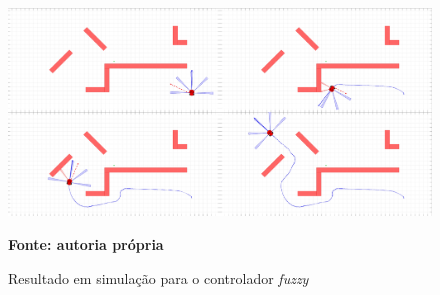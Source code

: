 \begin{figure}[ht]
\centering
\caption{Resultado em simulação para o controlador \textit{fuzzy}}
\label{fig:resultadoSimulacaoFuzzy}
		\centering
		\includegraphics[clip, 
scale=0.232]{Figuras/simulacao_fuzzy2Compactado}

	\textbf{Fonte: autoria própria}
\end{figure}